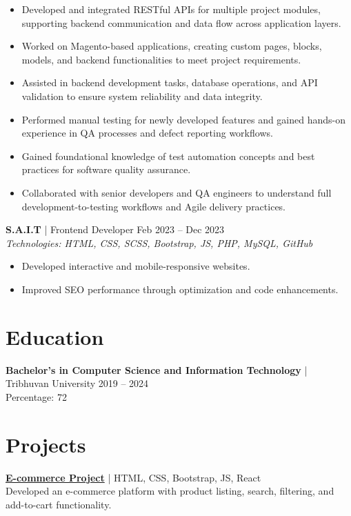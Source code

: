 \documentclass[a4paper,10pt]{article}
\begin{document}
\begin{itemize}
    \item Developed and integrated RESTful APIs for multiple project modules, supporting backend communication and data flow across application layers.
    \item Worked on Magento-based applications, creating custom pages, blocks, models, and backend functionalities to meet project requirements.
    \item Assisted in backend development tasks, database operations, and API validation to ensure system reliability and data integrity.
    \item Performed manual testing for newly developed features and gained hands-on experience in QA processes and defect reporting workflows.
    \item Gained foundational knowledge of test automation concepts and best practices for software quality assurance.
    \item Collaborated with senior developers and QA engineers to understand full development-to-testing workflows and Agile delivery practices.
\end{itemize}
 


\textbf{S.A.I.T} | Frontend Developer \hfill Feb 2023 -- Dec 2023 \\
\textit{Technologies: HTML, CSS, SCSS, Bootstrap, JS, PHP, MySQL, GitHub}

\begin{itemize}
    \item Developed interactive and mobile-responsive websites.
    \item Improved SEO performance through optimization and code enhancements.
\end{itemize}

\section*{Education}
\textbf{Bachelor's in Computer Science and Information Technology} | Tribhuvan University \hfill 2019 -- 2024 \\
Percentage: 72 \\


\section*{Projects}

\textbf{\href{https://bhimassignment.netlify.app/}{E-commerce Project}} | HTML, CSS, Bootstrap, JS, React \\
Developed an e-commerce platform with product listing, search, filtering, and add-to-cart functionality.
\end{document}
